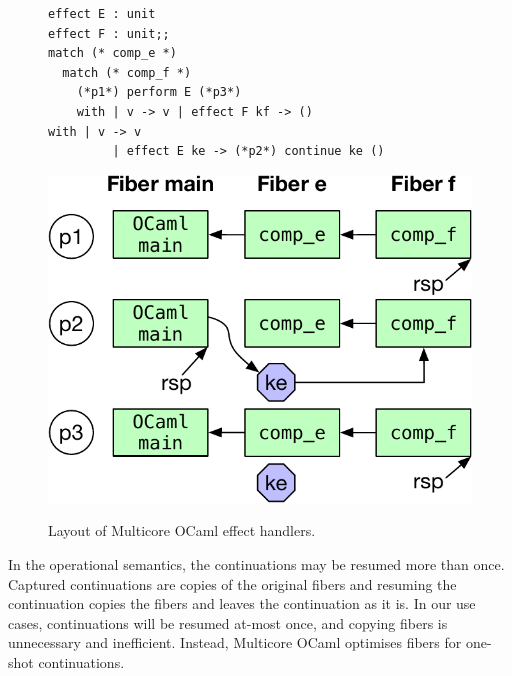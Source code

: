 \documentclass[sigplan,10pt,review,anonymous]{acmart}\settopmatter{printfolios=true,printccs=false,printacmref=false}
\begin{document}
\begin{figure}
\begin{minipage}{0.64\linewidth}
\begin{minipage}{\linewidth}
    \label{fig:mcstack}
    \vspace{2mm}
  \end{minipage}
  \begin{minipage}{0.55\linewidth}
    \begin{lstlisting}
effect E : unit
effect F : unit;;
match (* comp_e *)
  match (* comp_f *)
    (*p1*) perform E (*p3*)
	with | v -> v | effect F kf -> ()
with | v -> v
		 | effect E ke -> (*p2*) continue ke ()
    \end{lstlisting}
		\label{code:effimpl}
  \end{minipage}
  \begin{minipage}{0.44\linewidth}
    \centering
    \includegraphics[scale=0.42]{figures/fiber_handler}
    \label{fig:fiber_handler}
  \end{minipage}
\end{minipage}
\vspace{-2mm}
\caption{Layout of Multicore OCaml effect handlers.}
\vspace{-3mm}
\end{figure}

In the operational semantics, the continuations may be resumed more than once.
Captured continuations are copies of the original fibers and resuming the
continuation copies the fibers and leaves the continuation as it is. In our use
cases, continuations will be resumed at-most once, and copying fibers is
unnecessary and inefficient. Instead, Multicore OCaml optimises fibers for
one-shot continuations.
\end{document}
